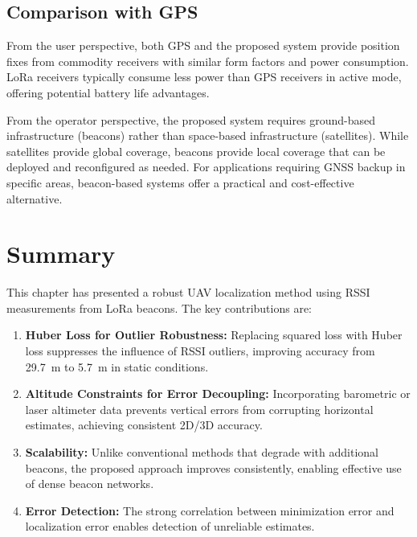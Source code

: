 \documentclass[master,final,11pt]{iscs-thesis}
\begin{document}
\subsection{Comparison with GPS}

From the user perspective, both GPS and the proposed system provide position fixes from commodity receivers with similar form factors and power consumption.
LoRa receivers typically consume less power than GPS receivers in active mode, offering potential battery life advantages.

From the operator perspective, the proposed system requires ground-based infrastructure (beacons) rather than space-based infrastructure (satellites).
While satellites provide global coverage, beacons provide local coverage that can be deployed and reconfigured as needed.
For applications requiring GNSS backup in specific areas, beacon-based systems offer a practical and cost-effective alternative.

\section{Summary}
\label{sec:uav_summary}

This chapter has presented a robust UAV localization method using RSSI measurements from LoRa beacons.
The key contributions are:

\begin{enumerate}
    \item \textbf{Huber Loss for Outlier Robustness:} Replacing squared loss with Huber loss suppresses the influence of RSSI outliers, improving accuracy from 29.7~m to 5.7~m in static conditions.
    
    \item \textbf{Altitude Constraints for Error Decoupling:} Incorporating barometric or laser altimeter data prevents vertical errors from corrupting horizontal estimates, achieving consistent 2D/3D accuracy.
    
    \item \textbf{Scalability:} Unlike conventional methods that degrade with additional beacons, the proposed approach improves consistently, enabling effective use of dense beacon networks.
    
    \item \textbf{Error Detection:} The strong correlation between minimization error and localization error enables detection of unreliable estimates.
\end{enumerate}
\end{document}
